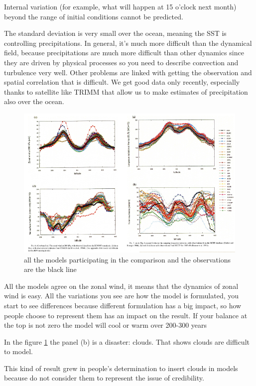 Internal variation (for example, what will happen at 15 o'clock next month) beyond the range of initial conditions cannot be predicted.



The standard deviation is very small over the ocean, meaning the SST is controlling precipitations. 
In general, it's much more difficult than the dynamical field, because precipitations are much more difficult than other dynamics since they are driven by physical processes so you need to describe convection and turbulence very well. Other problems are linked with getting the observation and spatial correlation that is difficult. We get good data only recently, especially thanks to satellite like TRIMM that allow us to make estimates of precipitation also over the ocean. 


\begin{figure}[htp!]
    \centering
    \includegraphics[width=0.6\linewidth]{uploads/Screenshot 2024-11-20 210633.png}
    \caption{all the models participating in the comparison and the observations are the black line}
    \label{fig:9}
\end{figure}
All the models agree on the zonal wind, it means that the dynamics of zonal wind is easy. All the variations you see are how the model is formulated, you start to see differences because different formulation has a big impact, so how people choose to represent them has an impact on the result. 
If your balance at the top is not zero the model will cool or warm over 200-300 years 

In the figure \ref{fig:9} the panel (b) is a disaster: clouds. That shows clouds are difficult to model.



This kind of result grew in people's determination to insert clouds in models because do not consider them to represent the issue of credibility. 


